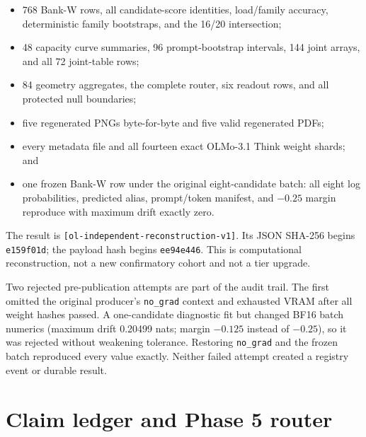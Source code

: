 \documentclass[11pt]{article}
\newcommand{\eid}[1]{{\footnotesize\nolinkurl{[#1]}}}
\begin{document}
\begin{itemize}
  \item 768 Bank-W rows, all candidate-score identities, load/family accuracy,
    deterministic family bootstraps, and the 16/20 intersection;
  \item 48 capacity curve summaries, 96 prompt-bootstrap intervals, 144 joint
    arrays, and all 72 joint-table rows;
  \item 84 geometry aggregates, the complete router, six readout rows, and all
    protected null boundaries;
  \item five regenerated PNGs byte-for-byte and five valid regenerated PDFs;
  \item every metadata file and all fourteen exact OLMo-3.1 Think weight
    shards; and
  \item one frozen Bank-W row under the original eight-candidate batch: all
    eight log probabilities, predicted alias, prompt/token manifest, and
    $-0.25$ margin reproduce with maximum drift exactly zero.
\end{itemize}

The result is \eid{ol-independent-reconstruction-v1}. Its JSON SHA-256 begins
\texttt{e159f01d}; the payload hash begins \texttt{ee94e446}. This is
computational reconstruction, not a new confirmatory cohort and not a tier
upgrade.

Two rejected pre-publication attempts are part of the audit trail. The first
omitted the original producer's \texttt{no\_grad} context and exhausted VRAM
after all weight hashes passed. A one-candidate diagnostic fit but changed BF16
batch numerics (maximum drift 0.20499 nats; margin $-0.125$ instead of
$-0.25$), so it was rejected without weakening tolerance. Restoring
\texttt{no\_grad} and the frozen batch reproduced every value exactly. Neither
failed attempt created a registry event or durable result.

\section{Claim ledger and Phase 5 router}
\end{document}
